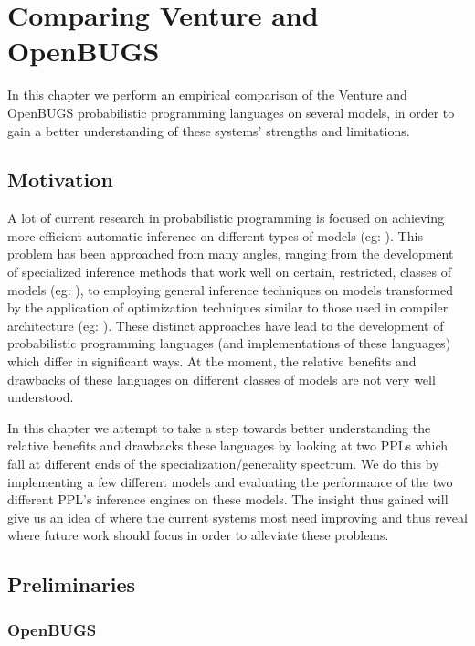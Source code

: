 \chapter{Comparing Venture and OpenBUGS}

In this chapter we perform an empirical comparison of the Venture and OpenBUGS probabilistic programming languages on several models, in order to gain a better understanding of these systems' strengths and limitations.

\section{Motivation}

A lot of current research in probabilistic programming is focused on achieving more efficient automatic inference on different types of models (eg: \cite{goodman2013principles, wingate2011nonstandard, wood2014new}). This problem has been approached from many angles, ranging from the development of specialized inference methods that work well on certain, restricted, classes of models (eg: \cite{stuhlmuller2012dynamic, yeh2012synthesizing}), to employing general inference techniques on models transformed by the application of optimization techniques similar to those used in compiler architecture (eg: \cite{mansinghka2014venture, yang2013incrementalizing}). These distinct approaches have lead to the development of probabilistic programming languages (and implementations of these languages) which differ in significant ways.  At the moment, the relative benefits and drawbacks of these languages on different classes of models are not very well understood. 

In this chapter we attempt to take a step towards better understanding the relative benefits and drawbacks these languages by looking at two PPLs which fall at different ends of the specialization/generality spectrum. We do this by implementing a few different models and evaluating the performance of the two different PPL's inference engines on these models. The insight thus gained will give us an idea of where the current systems most need improving and thus reveal where future work should focus in order to alleviate these problems.

\section{Preliminaries}
\subsection{OpenBUGS}

